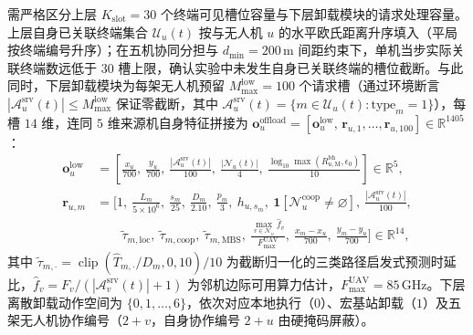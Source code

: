 需严格区分上层 $K_{\mathrm{slot}}=30$ 个终端可见槽位容量与下层卸载模块的请求处理容量。上层自身已关联终端集合 $\mathcal{U}_u(t)$ 按与无人机 $u$ 的水平欧氏距离升序填入（平局按终端编号升序）；在五机协同分担与 $d_{\min}=200\,\mathrm{m}$ 间距约束下，单机当步实际关联终端数远低于 $30$ 槽上限，确认实验中未发生自身已关联终端的槽位截断。与此同时，下层卸载模块为每架无人机预留 $M_{\max}^{\mathrm{low}}=100$ 个请求槽（通过环境断言 $|\mathcal{A}_u^{\mathrm{srv}}(t)|\leq M_{\max}^{\mathrm{low}}$ 保证零截断，其中 $\mathcal{A}_u^{\mathrm{srv}}(t)=\{m\in\mathcal{U}_u(t):\mathrm{type}_m=1\}$），每槽 $14$ 维，连同 $5$ 维来源机自身特征拼接为 $\mathbf{o}_u^{\mathrm{offload}}=[\mathbf{o}_u^{\mathrm{low}},\,\mathbf{r}_{u,1},\ldots,\mathbf{r}_{u,100}]\in\mathbb{R}^{1405}$：
\begin{equation}
 \begin{aligned}
 \mathbf o_u^{\mathrm{low}}&=\left[
  \frac{x_u}{700},\ \frac{y_u}{700},\
  \frac{|\mathcal A_u^{\mathrm{srv}}(t)|}{100},\
  \frac{|\mathcal N_u(t)|}{4},\
  \frac{\log_{10}\max(R^{\mathrm{bh}}_{u,\mathrm M},\epsilon_0)}{10}
 \right]\in\mathbb R^5,\\
 \mathbf r_{u,m}&=\Bigg[
  1,\ \frac{L_m}{5\times 10^6},\ \frac{s_m}{25},\
  \frac{D_m}{2.10},\ \frac{p_m}{3},\
  h_{u,s_m},\ \mathbf 1[\mathcal N_u^{\mathrm{coop}}\neq\varnothing],\
  \frac{|\mathcal A_u^{\mathrm{srv}}(t)|}{100},\\
 &\qquad
  \tilde\tau_{m,\mathrm{loc}},\ \tilde\tau_{m,\mathrm{coop}},\ \tilde\tau_{m,\mathrm{MBS}},\
  \frac{\max_{v\in\mathcal N_u}\hat f_{v}}{F_{\max}^{\mathrm{UAV}}},\
  \frac{x_m-x_u}{700},\ \frac{y_m-y_u}{700}
 \Bigg]\in\mathbb R^{14},
 \end{aligned}
 \label{eq:ch3-lower-obs-spec}
\end{equation}
其中 $\tilde{\tau}_{m,\cdot}=\operatorname{clip}(\widehat{T}_{m,\cdot}/D_m,0,10)/10$ 为截断归一化的三类路径启发式预测时延比，$\hat{f}_v=F_v/(|\mathcal{A}_v^{\mathrm{srv}}(t)|+1)$ 为邻机边际可用算力估计，$F_{\max}^{\mathrm{UAV}}=85\,\mathrm{GHz}$。下层离散卸载动作空间为 $\{0,1,\ldots,6\}$，依次对应本地执行（$0$）、宏基站卸载（$1$）及五架无人机协作编号（$2+v$，自身协作编号 $2+u$ 由硬掩码屏蔽）。

